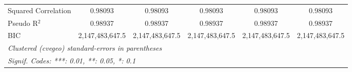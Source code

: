 \begin{table}[htbp]
\begin{tabular}{lccccc}
      Squared Correlation                                  & 0.98093         & 0.98093                & 0.98093         & 0.98093               & 0.98093\\  
      Pseudo R$^2$                                         & 0.98937         & 0.98937                & 0.98937         & 0.98937               & 0.98937\\  
      BIC                                                  & 2,147,483,647.5 & 2,147,483,647.5        & 2,147,483,647.5 & 2,147,483,647.5       & 2,147,483,647.5\\  
      \midrule \midrule
      \multicolumn{6}{l}{\emph{Clustered (cvegeo) standard-errors in parentheses}}\\
      \multicolumn{6}{l}{\emph{Signif. Codes: ***: 0.01, **: 0.05, *: 0.1}}\\
   \end{tabular}
\end{table}


